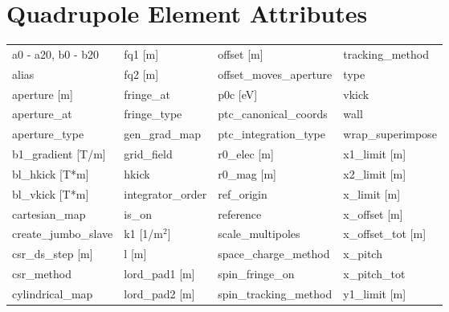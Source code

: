  \section{Quadrupole Element Attributes}
 \label{s:list.quadrupole}
 
 \begin{tabular}{llll} \toprule
a0 - a20, b0 - b20               & fq1 [m]                          & offset [m]                       & tracking_method                  \\
alias                            & fq2 [m]                          & offset_moves_aperture            & type                             \\
aperture [m]                     & fringe_at                        & p0c [eV]                         & vkick                            \\
aperture_at                      & fringe_type                      & ptc_canonical_coords             & wall                             \\
aperture_type                    & gen_grad_map                     & ptc_integration_type             & wrap_superimpose                 \\
b1_gradient [T/m]                & grid_field                       & r0_elec [m]                      & x1_limit [m]                     \\
bl_hkick [T*m]                   & hkick                            & r0_mag [m]                       & x2_limit [m]                     \\
bl_vkick [T*m]                   & integrator_order                 & ref_origin                       & x_limit [m]                      \\
cartesian_map                    & is_on                            & reference                        & x_offset [m]                     \\
create_jumbo_slave               & k1 [1/m$^2$]                     & scale_multipoles                 & x_offset_tot [m]                 \\
csr_ds_step [m]                  & l [m]                            & space_charge_method              & x_pitch                          \\
csr_method                       & lord_pad1 [m]                    & spin_fringe_on                   & x_pitch_tot                      \\
cylindrical_map                  & lord_pad2 [m]                    & spin_tracking_method             & y1_limit [m]                     \\

\end{tabular}
